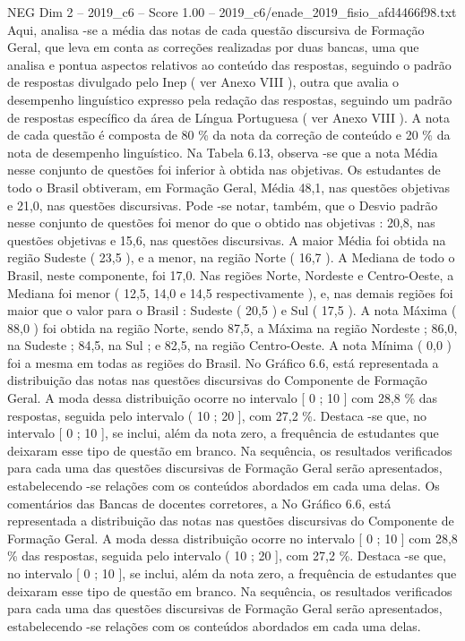 \begin{textsample}{NEG Dim 2 – 2019\_c6 – Score 1.00 – 2019\_c6/enade\_2019\_fisio\_afd4466f98.txt}
Aqui, analisa -se a média das notas de cada questão discursiva de Formação Geral, que leva em conta as correções realizadas por duas bancas, uma que analisa e pontua aspectos relativos ao conteúdo das respostas, seguindo o padrão de respostas divulgado pelo Inep ( ver Anexo VIII ), outra que avalia o desempenho linguístico expresso pela redação das respostas, seguindo um padrão de respostas específico da área de Língua Portuguesa ( ver Anexo VIII ).
A nota de cada questão é composta de 80 \% da nota da correção de conteúdo e 20 \% da nota de desempenho linguístico.
Na Tabela 6.13, observa -se que a nota Média nesse conjunto de questões foi inferior à obtida nas objetivas.
Os estudantes de todo o Brasil obtiveram, em Formação Geral, Média 48,1, nas questões objetivas e 21,0, nas questões discursivas.
Pode -se notar, também, que o Desvio padrão nesse conjunto de questões foi menor do que o obtido nas objetivas : 20,8, nas questões objetivas e 15,6, nas questões discursivas.
A maior Média foi obtida na região Sudeste ( 23,5 ), e a menor, na região Norte ( 16,7 ).
A Mediana de todo o Brasil, neste componente, foi 17,0.
Nas regiões Norte, Nordeste e Centro-Oeste, a Mediana foi menor ( 12,5, 14,0 e 14,5 respectivamente ), e, nas demais regiões foi maior que o valor para o Brasil : Sudeste ( 20,5 ) e Sul ( 17,5 ).
A nota Máxima ( 88,0 ) foi obtida na região Norte, sendo 87,5, a Máxima na região Nordeste ; 86,0, na Sudeste ; 84,5, na Sul ; e 82,5, na região Centro-Oeste.
A nota Mínima ( 0,0 ) foi a mesma em todas as regiões do Brasil.
No Gráfico 6.6, está representada a distribuição das notas nas questões discursivas do Componente de Formação Geral.
A moda dessa distribuição ocorre no intervalo [ 0 ; 10 ] com 28,8 \% das respostas, seguida pelo intervalo ( 10 ; 20 ], com 27,2 \%.
Destaca -se que, no intervalo [ 0 ; 10 ], se inclui, além da nota zero, a frequência de estudantes que deixaram esse tipo de questão em branco.
Na sequência, os resultados verificados para cada uma das questões discursivas de Formação Geral serão apresentados, estabelecendo -se relações com os conteúdos abordados em cada uma delas.
Os comentários das Bancas de docentes corretores, a No Gráfico 6.6, está representada a distribuição das notas nas questões discursivas do Componente de Formação Geral.
A moda dessa distribuição ocorre no intervalo [ 0 ; 10 ] com 28,8 \% das respostas, seguida pelo intervalo ( 10 ; 20 ], com 27,2 \%.
Destaca -se que, no intervalo [ 0 ; 10 ], se inclui, além da nota zero, a frequência de estudantes que deixaram esse tipo de questão em branco.
Na sequência, os resultados verificados para cada uma das questões discursivas de Formação Geral serão apresentados, estabelecendo -se relações com os conteúdos abordados em cada uma delas.

\end{textsample}

